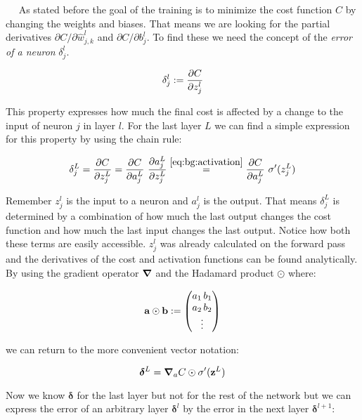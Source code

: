 $\quad$ As stated before the goal of the training is to minimize the cost function $C$ by changing the weights and biases. That means we are looking for the partial derivatives $\partial C / \partial \hat w^l_{j,k}$ and
$\partial C / \partial b^l_j$. To find these we need the concept of the \textit{error of a neuron} $\delta^l_j$.

\begin{equation} 
    \delta^l_j := \pdv{C}{z^l_j}
\end{equation}

This property expresses how much the final cost is affected by a change to the input of neuron $j$ in layer $l$. For the last layer $L$ we can find a simple expression for this property by using the chain rule:

\begin{equation} \label{eq:bg:back_prop}
    \delta^L_j = \pdv{C}{z^L_j} = \pdv{C}{a^L_j} \ \pdv{a^L_j}{z^L_j}
    \stackrel{\eqref{eq:bg:activation}}{=}
    \pdv{C}{a^L_j} \ \sigma'(z^L_j)
\end{equation}

Remember $z^l_j$ is the input to a neuron and $a^l_j$ is the output. That means $\delta^L_j$ is determined by a combination of how much the last output changes the cost function and how much the last input changes the last output. Notice how both these terms are easily accessible. $z^l_j$ was already calculated on the forward pass and the derivatives of the cost and activation functions can be found analytically. By using the gradient operator $\grad$ and the Hadamard product $\odot$ where:

\begin{equation}
    \vb a \odot \vb b :=
    \begin{pmatrix}
        a_1 \, b_1 \\
        a_2 \, b_2 \\
        \vdots
    \end{pmatrix}
\end{equation}

we can return to the more convenient vector notation:

\begin{equation} \label{eq:bg:back1}
    \boldsymbol \delta^L = \grad_a C  \odot \sigma'(\vb z^L)
\end{equation}

Now we know $\boldsymbol \delta$ for the last layer but not for the rest of the network but we can express the error of an arbitrary layer $\boldsymbol \delta^l$ by the error in the next layer $\boldsymbol \delta^{l+1}$:

